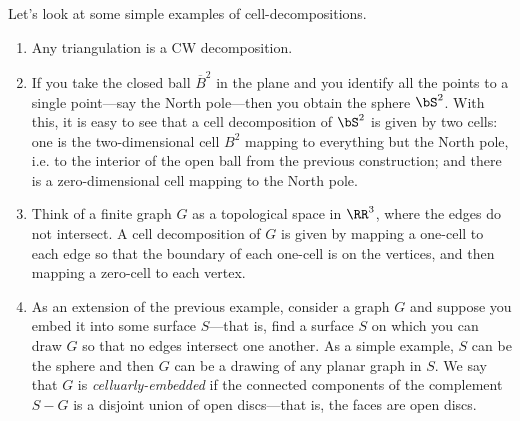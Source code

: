 \documentclass{axolotl}
\begin{document}
Let's look at some simple examples of cell-decompositions.
\begin{enumerate}
  \item Any triangulation is a CW decomposition.
  \item If you take the closed ball \(\overline B^2\) in the plane and you identify all the points
    to a single point---say the North pole---then you obtain the sphere
    \(\bS^2\). With this, it is easy to see that a cell decomposition of
    \(\bS^2\) is given by two cells: one is the two-dimensional cell \(B^2\)
    mapping to everything but the North pole, i.e. to the interior of the open
    ball from the previous construction; and there is a zero-dimensional cell
    mapping to the North pole.
  \item Think of a finite graph \(G\) as a topological space in \(\RR^3\),
    where the edges do not intersect. A cell decomposition of \(G\) is given by
    mapping a one-cell to each edge so that the boundary of each one-cell is on
    the vertices, and then mapping a zero-cell to each vertex.
  \item As an extension of the previous example, consider a graph \(G\) and
    suppose you embed it into some surface \(S\)---that is, find a surface
    \(S\) on which you can draw \(G\) so that no edges intersect one another.
    As a simple example, \(S\) can be the sphere and then \(G\) can be a
    drawing of any planar graph in \(S\). We say that \(G\) is
    \emph{celluarly-embedded} if the connected components of the complement \(S
      - G\) is a disjoint union of open discs---that is, the faces are open
    discs.
\end{enumerate}
\end{document}
